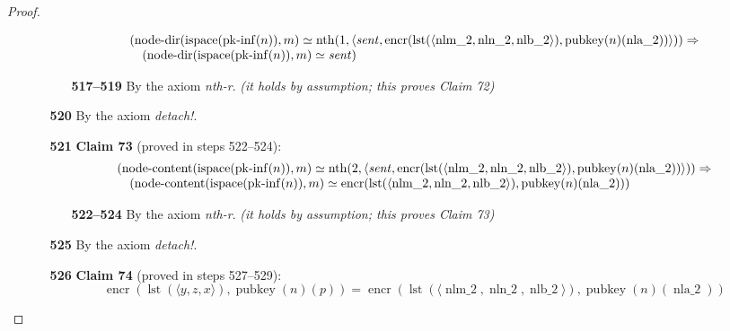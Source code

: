 \documentclass[11pt]{article}
\theoremstyle{plain}
\begin{document}
\begin{proof}
\begin{itemize}[leftmargin=2.8em, itemsep=4pt, parsep=1pt]
\begin{itemize}[leftmargin=2.8em, itemsep=4pt, parsep=1pt]
\begin{equation*}
\begin{array}{@{}l@{}} (\operatorname{node\text{-}dir}(\operatorname{ispace}(\operatorname{pk\text{-}inf}(n)), m) \simeq \operatorname{nth}(1, \langle \mathit{sent}, \operatorname{encr}(\operatorname{lst}(\langle \operatorname{nlm\_2}, \operatorname{nln\_2}, \operatorname{nlb\_2} \rangle), \operatorname{pubkey}(n)(\operatorname{nla\_2})) \rangle)) \Rightarrow \\ \quad (\operatorname{node\text{-}dir}(\operatorname{ispace}(\operatorname{pk\text{-}inf}(n)), m) \simeq \mathit{sent}) \end{array}
\end{equation*}

  \begin{itemize}[leftmargin=2.8em, itemsep=4pt, parsep=1pt]
  \item[\textbf{517--519}] By the axiom \emph{nth-r}.  \emph{(it holds by assumption; this proves Claim 72)}
  \end{itemize}
  \item[\textbf{520}] By the axiom \emph{detach!}.
  \item[\textbf{521}] \textbf{Claim 73} (proved in steps 522--524):
\begin{equation*}
\begin{array}{@{}l@{}} (\operatorname{node\text{-}content}(\operatorname{ispace}(\operatorname{pk\text{-}inf}(n)), m) \simeq \operatorname{nth}(2, \langle \mathit{sent}, \operatorname{encr}(\operatorname{lst}(\langle \operatorname{nlm\_2}, \operatorname{nln\_2}, \operatorname{nlb\_2} \rangle), \operatorname{pubkey}(n)(\operatorname{nla\_2})) \rangle)) \Rightarrow \\ \quad (\operatorname{node\text{-}content}(\operatorname{ispace}(\operatorname{pk\text{-}inf}(n)), m) \simeq \operatorname{encr}(\operatorname{lst}(\langle \operatorname{nlm\_2}, \operatorname{nln\_2}, \operatorname{nlb\_2} \rangle), \operatorname{pubkey}(n)(\operatorname{nla\_2}))) \end{array}
\end{equation*}

  \begin{itemize}[leftmargin=2.8em, itemsep=4pt, parsep=1pt]
  \item[\textbf{522--524}] By the axiom \emph{nth-r}.  \emph{(it holds by assumption; this proves Claim 73)}
  \end{itemize}
  \item[\textbf{525}] By the axiom \emph{detach!}.
  \item[\textbf{526}] \textbf{Claim 74} (proved in steps 527--529):
\begin{equation*}
\operatorname{encr}(\operatorname{lst}(\langle y, z, x \rangle), \operatorname{pubkey}(n)(p)) = \operatorname{encr}(\operatorname{lst}(\langle \operatorname{nlm\_2}, \operatorname{nln\_2}, \operatorname{nlb\_2} \rangle), \operatorname{pubkey}(n)(\operatorname{nla\_2}))
\end{equation*}


\end{itemize}
\end{itemize}
\end{proof}
\end{document}
